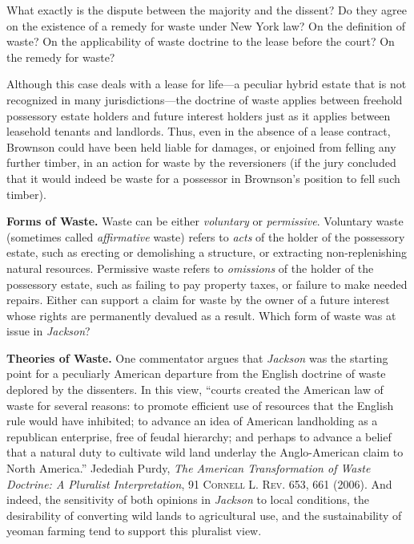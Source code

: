 
\item What exactly is the dispute between the majority and the dissent? Do they
agree on the existence of a remedy for waste under New York law? On the
definition of waste? On the applicability of waste doctrine to the lease before
the court? On the remedy for waste?


\item Although this case deals with a lease for life---a peculiar hybrid estate
that is not recognized in many jurisdictions---the doctrine of waste applies
between freehold possessory estate holders and future interest holders just as
it applies between leasehold tenants and landlords. Thus, even in the absence
of a lease contract, Brownson could have been held liable for damages, or
enjoined from felling any further timber, in an action for waste by the
reversioners (if the jury concluded that it would indeed be waste for a
possessor in Brownson's position to fell such timber).


\item \textbf{Forms of Waste.} Waste can be either \textit{voluntary} or
\textit{permissive}. Voluntary waste (sometimes called \textit{affirmative}
waste) refers to \textit{acts} of the holder of the possessory estate, such as
erecting or demolishing a structure, or extracting non-replenishing natural
resources. Permissive waste refers to \textit{omissions} of the holder of the
possessory estate, such as failing to pay property taxes, or failure to make
needed repairs. Either can support a claim for waste by the owner of a future
interest whose rights are permanently devalued as a result. Which form of waste
was at issue in \textit{Jackson}?


\item \textbf{Theories of Waste.} One commentator argues that \textit{Jackson}
was the starting point for a peculiarly American departure from the English
doctrine of waste deplored by the dissenters. In this view, ``courts created
the American law of waste for several reasons: to promote efficient use of
resources that the English rule would have inhibited; to advance an idea of
American landholding as a republican enterprise, free of feudal hierarchy; and
perhaps to advance a belief that a natural duty to cultivate wild land underlay
the Anglo-American claim to North America.'' Jedediah Purdy, \textit{The
American Transformation of Waste Doctrine: A Pluralist Interpretation}, 91
\textsc{Cornell L. Rev}. 653, 661 (2006). And indeed, the sensitivity of both
opinions in \textit{Jackson} to local conditions, the desirability of
converting wild lands to agricultural use, and the sustainability of yeoman
farming tend to support this pluralist view.


